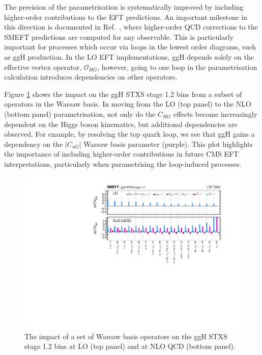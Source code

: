 The precision of the parametrisation is systematically improved by including higher-order contributions to the EFT predictions. An important milestone in this direction is documented in Ref.~\cite{Degrande:2020evl}, where higher-order QCD corrections to the SMEFT predictions are computed for any observable. This is particularly important for processes which occur via loops in the lowest order diagrams, such as ggH production. In the LO EFT implementations, ggH depends solely on the effective vertex operator, $\mathcal{O}_{HG}$, however, going to one loop in the parametrisation calculation introduces dependencies on other operators.

Figure \ref{fig:smeftatnlo} shows the impact on the ggH STXS stage 1.2 bins from a subset of operators in the Warsaw basis. In moving from the LO (top panel) to the NLO (bottom panel) parametrisation, not only do the $C_{HG}$ effects become increasingly dependent on the Higgs boson kinematics, but additional dependencies are observed. For example, by resolving the top quark loop, we see that ggH gains a dependency on the $|C_{uG}|$ Warsaw basis parameter (purple). This plot highlights the importance of including higher-order contributions in future CMS EFT interpretations, particularly when parametrising the loop-induced processes.

\begin{figure}[htb!]
  \centering
  \includegraphics[width=1\textwidth]{Figures/eft/smeft/SMEFTatNLO.pdf}
  \caption[SMEFT at NLO QCD for ggH]
  {
    The impact of a set of Warsaw basis operators on the ggH STXS stage 1.2 bins at LO (top panel) and at NLO QCD (bottom panel).
  }
  \label{fig:smeftatnlo}
\end{figure}


